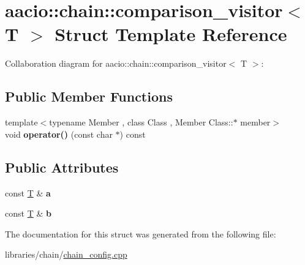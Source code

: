 \hypertarget{structaacio_1_1chain_1_1comparison__visitor}{}\section{aacio\+:\+:chain\+:\+:comparison\+\_\+visitor$<$ T $>$ Struct Template Reference}
\label{structaacio_1_1chain_1_1comparison__visitor}


Collaboration diagram for aacio\+:\+:chain\+:\+:comparison\+\_\+visitor$<$ T $>$\+:
\subsection*{Public Member Functions}
\begin{DoxyCompactItemize}
\item 
\mbox{\label{structaacio_1_1chain_1_1comparison__visitor_a788d29f2bff1bbdbbd252ed222fe7b24}} 
{\footnotesize template$<$typename Member , class Class , Member Class\+::$\ast$ member$>$ }\\void {\bfseries operator()} (const char $\ast$) const
\end{DoxyCompactItemize}
\subsection*{Public Attributes}
\begin{DoxyCompactItemize}
\item 
\mbox{\label{structaacio_1_1chain_1_1comparison__visitor_a17f8712f3ee9f82b5cb5e6f8b388cdd2}} 
const \mbox{\hyperlink{struct_t}{T}} \& {\bfseries a}
\item 
\mbox{\label{structaacio_1_1chain_1_1comparison__visitor_af65de9e190a158e89c96bdb45edae7e0}} 
const \mbox{\hyperlink{struct_t}{T}} \& {\bfseries b}
\end{DoxyCompactItemize}


The documentation for this struct was generated from the following file\+:\begin{DoxyCompactItemize}
\item 
libraries/chain/\mbox{\hyperlink{chain__config_8cpp}{chain\+\_\+config.\+cpp}}\end{DoxyCompactItemize}
